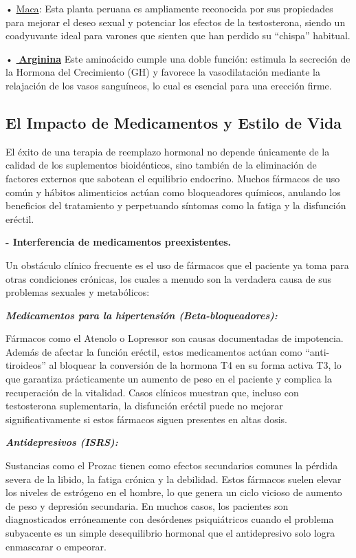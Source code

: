 \documentclass[
  spanish,
]{article}
\begin{document}
• \href{https://metaph.es/es}{Maca}:
Esta planta peruana es ampliamente reconocida por sus propiedades para mejorar el deseo sexual y potenciar los efectos de la testosterona, siendo un coadyuvante ideal para varones que sienten que han perdido su ``chispa'' habitual.

• \textbf{\href{https://metaph.es/web/login?redirect=/es/shop/arginina-l-usp-127935\#attr=217046}{🛒Arginina}}
Este aminoácido cumple una doble función: estimula la secreción de la Hormona del Crecimiento (GH) y favorece la vasodilatación mediante la relajación de los vasos sanguíneos, lo cual es esencial para una erección firme.

\subsection{El Impacto de Medicamentos y Estilo de Vida}\label{el-impacto-de-medicamentos-y-estilo-de-vida}

El éxito de una terapia de reemplazo hormonal no depende únicamente de la calidad de los suplementos bioidénticos, sino también de la eliminación de factores externos que sabotean el equilibrio endocrino. Muchos fármacos de uso común y hábitos alimenticios actúan como bloqueadores químicos, anulando los beneficios del tratamiento y perpetuando síntomas como la fatiga y la disfunción eréctil.

\textbf{- Interferencia de medicamentos preexistentes.}

Un obstáculo clínico frecuente es el uso de fármacos que el paciente ya toma para otras condiciones crónicas, los cuales a menudo son la verdadera causa de sus problemas sexuales y metabólicos:

\textbf{\emph{Medicamentos para la hipertensión (Beta-bloqueadores):}}

Fármacos como el Atenolo o Lopressor son causas documentadas de impotencia. Además de afectar la función eréctil, estos medicamentos actúan como ``anti-tiroideos'' al bloquear la conversión de la hormona T4 en su forma activa T3, lo que garantiza prácticamente un aumento de peso en el paciente y complica la recuperación de la vitalidad. Casos clínicos muestran que, incluso con testosterona suplementaria, la disfunción eréctil puede no mejorar significativamente si estos fármacos siguen presentes en altas dosis.

\textbf{\emph{Antidepresivos (ISRS):}}

Sustancias como el Prozac tienen como efectos secundarios comunes la pérdida severa de la libido, la fatiga crónica y la debilidad. Estos fármacos suelen elevar los niveles de estrógeno en el hombre, lo que genera un ciclo vicioso de aumento de peso y depresión secundaria. En muchos casos, los pacientes son diagnosticados erróneamente con desórdenes psiquiátricos cuando el problema subyacente es un simple desequilibrio hormonal que el antidepresivo solo logra enmascarar o empeorar.
\end{document}

